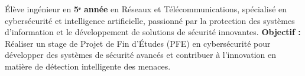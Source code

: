 
\begin{cvparagraph}

Élève ingénieur en \textbf{5ᵉ année}  en Réseaux et Télécommunications, spécialisé en cybersécurité et intelligence artificielle, passionné par la protection des systèmes d'information et le développement de solutions de sécurité innovantes.
\newline  
\textbf{Objectif :} Réaliser un stage de Projet de Fin d'Études (PFE) en cybersécurité pour développer des systèmes de sécurité avancés et contribuer à l'innovation en matière de détection intelligente des menaces.

\end{cvparagraph}
